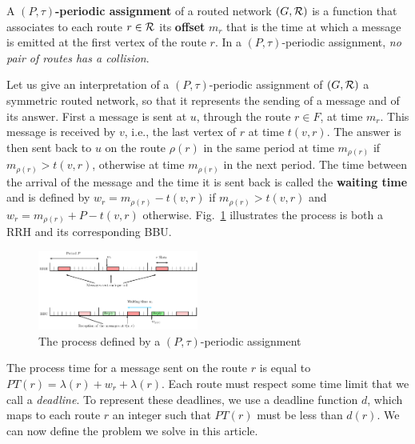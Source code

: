 \documentclass[a4paper,10pt]{IEEEtran}
\begin{document}
         A {\bf $(P,\tau)$-periodic assignment} of a routed network $(G,\cal R)$ is a function that associates to each route 
         $r \in \cal R$ its \textbf{offset} $m_r$ that is the time at which a message is emitted at the first vertex of the route $r$.  In a $(P,\tau)$-periodic assignment, \emph{no pair of routes has a collision}.
                     
                     Let us give an interpretation of a $(P,\tau)$-periodic assignment of $(G,{\cal R})$ a symmetric routed network, so that it represents the sending of a message and of its answer.
	First a message is sent at $u$, through the route $r \in F$, at time $m_r$.
      This message is received by $v$, i.e., the last vertex of $r$ at time $t(v,r)$. The answer is then sent back to $u$ on the route $\rho(r)$ in the same period at time $m_{\rho(r)}$ if $m_{\rho(r)} > t(v,r)$, otherwise at time $m_{\rho(r)}$ in the next period. The time between the arrival of the message and the time it is sent back is called the \textbf{waiting time} and is defined by $w_r = m_{\rho(r)} - t(v,r)$ if $m_{\rho(r)} > t(v,r)$ and $w_r = m_{\rho(r)} + P - t(v,r)$ otherwise. Fig.~\ref{fig:assignment} illustrates the process is both a RRH and its corresponding BBU.
 
     \begin{figure}[h]
      \begin{center}
      \includegraphics[width=0.47\textwidth]{rrh.pdf}
      \end{center}
      \caption{The process defined by a $(P,\tau)$-periodic assignment}\label{fig:assignment}
      \end{figure}
      
The process time for a message sent on the route $r$ is equal to $PT(r)=\lambda(r)+ w_r+\lambda(r)$. Each route must respect some time limit that we call a \emph{deadline}. To represent these deadlines, 
      we use a deadline function $d$, which maps to each route $r$ an integer such that $PT(r)$ must be less than $d(r)$.
    We can now define the problem we solve in this article.
\end{document}
